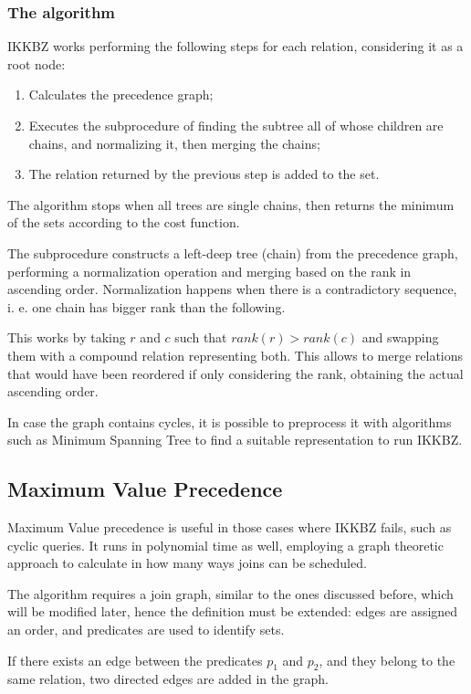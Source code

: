 \subsubsection{The algorithm}
IKKBZ works performing the following steps for each relation, considering it as a root node:
\begin{enumerate}
	\item Calculates the precedence graph;
	\item Executes the subprocedure of finding the subtree all of whose children are chains, and normalizing it, then merging the chains;
	\item The relation returned by the previous step is added to the set.
\end{enumerate}
The algorithm stops when all trees are single chains, then returns the minimum of the sets according to the cost function.

The subprocedure constructs a left-deep tree (chain) from the precedence graph, performing a normalization operation and merging based on the rank in ascending order. Normalization happens when there is a contradictory sequence, i. e. one chain has bigger rank than the following.

This works by taking $r$ and $c$ such that $rank(r) > rank(c)$ and swapping them with a compound relation representing both. This allows to merge relations that would have been reordered if only considering the rank, obtaining the actual ascending order.

In case the graph contains cycles, it is possible to preprocess it with algorithms such as Minimum Spanning Tree to find a suitable representation to run IKKBZ.

\subsection{Maximum Value Precedence}
Maximum Value precedence is useful in those cases where IKKBZ fails, such as cyclic queries. It runs in polynomial time as well, employing a graph theoretic approach to calculate in how many ways joins can be scheduled.

The algorithm requires a join graph, similar to the ones discussed before, which will be modified later, hence the definition must be extended: edges are assigned an order, and predicates are used to identify sets.

If there exists an edge between the predicates $p_1$ and $p_2$, and they belong to the same relation, two directed edges are added in the graph. 


